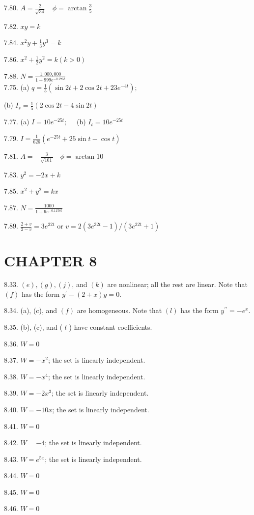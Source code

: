 \documentclass[10pt]{article}
\begin{document}
7.80. $A=\frac{2}{\sqrt{34}} \quad \phi=\arctan \frac{3}{5}$

7.82. $x y=k$

7.84. $x^{2} y+\frac{1}{3} y^{3}=k$

7.86. $x^{2}+\frac{1}{2} y^{2}=k(k>0)$

7.88. $N=\frac{1,000,000}{1+999 e^{-0.275 t}}$\\
7.75. (a) $q=\frac{1}{5}\left(\sin 2 t+2 \cos 2 t+23 e^{-4 t}\right)$;

(b) $I_{s}=\frac{1}{5}(2 \cos 2 t-4 \sin 2 t)$

7.77. (a) $I=10 e^{-25 t} ; \quad$ (b) $I_{t}=10 e^{-25 t}$

7.79. $I=\frac{1}{626}\left(e^{-25 t}+25 \sin t-\cos t\right)$

7.81. $A=-\frac{3}{\sqrt{101}} \quad \phi=\arctan 10$

7.83. $y^{2}=-2 x+k$

7.85. $x^{2}+y^{2}=k x$

7.87. $N=\frac{1000}{1+9 e^{-0.1158 t}}$

7.89. $\frac{2+v}{2-v}=3 e^{32 t}$ or $v=2\left(3 e^{32 t}-1\right) /\left(3 e^{32 t}+1\right)$

\section*{CHAPTER 8}
8.33. $(e),(g),(j)$, and $(k)$ are nonlinear; all the rest are linear. Note that $(f)$ has the form $y^{\prime}-(2+x) y=0$.

8.34. (a), (c), and $(f)$ are homogeneous. Note that $(l)$ has the form $y^{\prime \prime}=-e^{x}$.

8.35. (b), (c), and ( $l$ ) have constant coefficients.

8.36. $W=0$

8.37. $W=-x^{2}$; the set is linearly independent.

8.38. $W=-x^{4}$; the set is linearly independent.

8.39. $W=-2 x^{3}$; the set is linearly independent.

8.40. $W=-10 x$; the set is linearly independent.

8.41. $W=0$

8.42. $W=-4$; the set is linearly independent.

8.43. $W=e^{5 x}$; the set is linearly independent.

8.44. $W=0$

8.45. $W=0$

8.46. $W=0$
\end{document}
